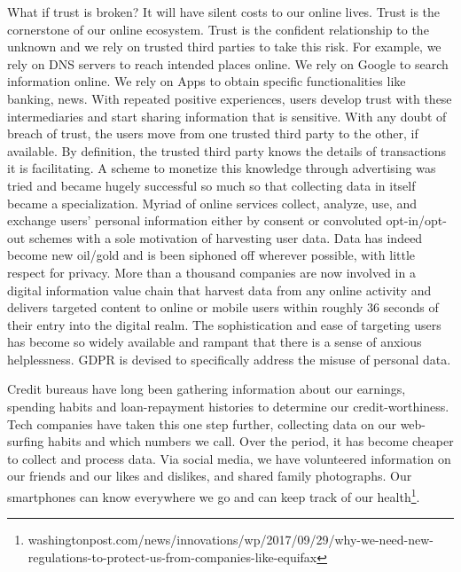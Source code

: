 \documentclass[a4paper,twoside]{article}
\begin{document}
\noindent What if trust is broken? It will have silent costs to our
online lives. Trust is the cornerstone of our online ecosystem. Trust
is the confident relationship to the unknown and we rely on trusted
third parties to take this risk. For example, we rely on DNS servers
to reach intended places online. We rely on Google to search
information online. We rely on Apps to obtain specific functionalities
like banking, news. With repeated positive experiences, users develop
trust with these intermediaries and start sharing information that is
sensitive. With any doubt of breach of trust, the users move from one
trusted third party to the other, if available. By definition, the
trusted third party knows the details of transactions it is
facilitating. A scheme to monetize this knowledge through advertising
was tried and became hugely successful so much so that collecting data
in itself became a specialization. Myriad of online services collect,
analyze, use, and exchange users' personal information either by
consent or convoluted opt-in/opt-out schemes with a sole motivation of
harvesting user data. Data has indeed become new oil/gold and is been
siphoned off wherever possible, with little respect for privacy. More
than a thousand companies are now involved in a digital information
value chain that harvest data from any online activity and delivers
targeted content to online or mobile users within roughly 36 seconds
of their entry into the digital realm. The sophistication and ease of
targeting users has become so widely available and rampant that there
is a sense of anxious helplessness. GDPR is devised to specifically
address the misuse of personal data.

Credit bureaus have long been gathering information about our
earnings, spending habits and loan-repayment histories to determine
our credit-worthiness. Tech companies have taken this one step
further, collecting data on our web-surfing habits and which numbers
we call. Over the period, it has become cheaper to collect and process
data. Via social media, we have volunteered information on our friends
and our likes and dislikes, and shared family photographs. Our
smartphones can know everywhere we go and can keep track of our
health\footnote{washingtonpost.com/news/innovations/wp/2017/09/29/why-we-need-new-regulations-to-protect-us-from-companies-like-equifax}.


\end{document}
